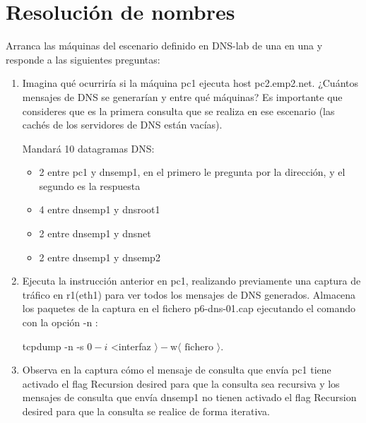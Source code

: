 \documentclass[12pt, a4paper]{report}
\begin{document}
\chapter{Resolución de nombres}
Arranca las máquinas del escenario definido en DNS-lab de una en una y responde a las siguientes preguntas:

\begin{enumerate}
  \item Imagina qué ocurriría si la máquina pc1 ejecuta host pc2.emp2.net. ¿Cuántos mensajes de DNS se generarían y entre qué máquinas? Es importante que consideres que es la primera consulta que se realiza en ese escenario (las cachés de los servidores de DNS están vacías).
  
  Mandará 10 datagramas DNS:
  \begin{itemize}
  	\item 2 entre pc1 y dnsemp1, en el primero le pregunta por la dirección, y el segundo es la respuesta
  	\item 4 entre dnsemp1 y dnsroot1
  	\item 2 entre dnsemp1 y dnsnet
  	\item 2 entre dnsemp1 y dnsemp2
  \end{itemize}

  \item Ejecuta la instrucción anterior en pc1, realizando previamente una captura de tráfico en r1(eth1) para ver todos los mensajes de DNS generados. Almacena los paquetes de la captura en el fichero p6-dns-01.cap ejecutando el comando con la opción -n :

	tcpdump -n -s $0-i$ <interfaz $\rangle-\mathrm{w}\langle\text { fichero }\rangle$.

  \item Observa en la captura cómo el mensaje de consulta que envía pc1 tiene activado el flag Recursion desired para que la consulta sea recursiva y los mensajes de consulta que envía dnsemp1 no tienen activado el flag Recursion desired para que la consulta se realice de forma iterativa.
  

\end{enumerate}
\end{document}

